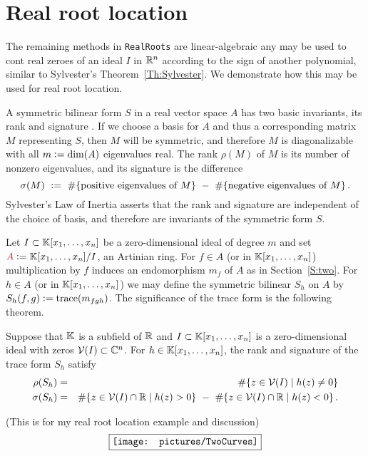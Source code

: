 
\section{Real root location}\label{S:three}
%
%
The remaining methods in  \texttt{RealRoots} are linear-algebraic any may be used to cont real zeroes of an ideal $I$ in $\mathbb{R}^n$ according to
the sign of another polynomial, similar to Sylvester's Theorem~\ref{Th:Sylvester}.
We demonstrate how this may be used for real root location.

A symmetric bilinear form $S$ in a real vector space $A$ has two basic invariants, its rank  and signature
.
If we choose a basis for $A$ and thus a corresponding matrix $M$ representing $S$, then $M$ will be symmetric, and therefore $M$ is
diagonalizable with all $m\vcentcolon = \dim(A)$ eigenvalues real.
The rank $\rho(M)$ of $M$ is its number of nonzero eigenvalues, and its signature  is the difference
\[
\sigma(M)\ \vcentcolon =\ \#\{\mbox{positive eigenvalues of $M$}\}
\ -\ \#\{\mbox{negative eigenvalues of $M$}\}\,.
\]
Sylvester's Law of Inertia asserts that the rank and signature are independent of the choice of basis, and therefore are invariants of the
symmetric form $S$.

Let $I\subset\mathbb{K}[x_1,\dotsc,x_n]$ be a zero-dimensional ideal of degree $m$ and set $\defcolor{A}\vcentcolon=\KK[x_1,\dotsc,x_n]/I$, an
Artinian ring.
For $f\in A$ (or in $\mathbb{K}[x_1,\dotsc,x_n]$) multiplication by $f$ induces an endomorphism $m_f$ of $A$ as in Section~\ref{S:two}.
For $h\in A$ (or in $\mathbb{K}[x_1,\dotsc,x_n]$) we may define the symmetric bilinear  $S_h$ on $A$ by
$S_h(f,g)\vcentcolon= \mbox{trace}(m_{fgh})$.
The significance of the trace form is the following theorem.

\begin{theorem}
  Suppose that $\mathbb{K}$ is a subfield of $\mathbb{R}$ and $I\subset\mathbb{K}[x_1,\dotsc,x_n]$ is a zero-dimensional ideal with zeros
  $\mathcal{V}(I)\subset\mathbb{C}^n$.
  For $h\in\mathbb{K}[x_1,\dotsc,x_n]$, the rank and signature of the trace form $S_h$ satisfy
  \begin{eqnarray*}
    \rho(S_h)&=&
      \#\{ z \in \calV(I) \mid h(z)\neq 0\}   \\
    \sigma(S_h)&=&
        \#\{ z \in \calV(I)\cap\RR \mid h(z)> 0\} \ -\ 
        \#\{ z \in \calV(I)\cap\RR \mid h(z)< 0\} \,.
  \end{eqnarray*}
\end{theorem}



(This is for my real root location example and discussion)
\[
\fbox{\texttt{[image: pictures/TwoCurves]}}
\]
%
%
\newpage
